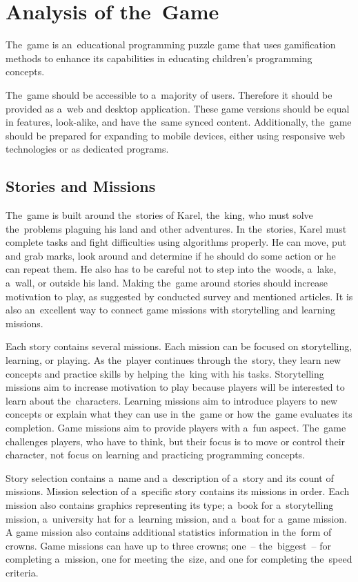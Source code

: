 \section{Analysis of the~Game}
\label{analysis:game}

The~game \emph{\myAppName} is an~educational programming puzzle game that uses gamification methods to enhance its capabilities in educating children's programming concepts.

The~game should be accessible to a~majority of users.
Therefore it should be provided as a~web and desktop application.
These game versions should be equal in features, look-alike, and have the~same synced content.
Additionally, the~game should be prepared for expanding to mobile devices, either using responsive web technologies or as dedicated programs.

\subsection{Stories and Missions}
\label{analysis:game:stories-and-missions}

The~game is built around the~stories of Karel, the~king, who must solve the~problems plaguing his land and other adventures.
In the~stories, Karel must complete tasks and fight difficulties using algorithms properly.
He can move, put and grab marks, look around and determine if he should do some action or he can repeat them.
He also has to be careful not to step into the~woods, a~lake, a~wall, or outside his land.
Making the~game around stories should increase motivation to play, as suggested by conducted survey and mentioned articles.
It is also an~excellent way to connect game missions with storytelling and learning missions.

Each story contains several missions.
Each mission can be focused on storytelling, learning, or playing.
As the~player continues through the~story, they learn new concepts and practice skills by helping the~king with his tasks.
Storytelling missions aim to increase motivation to play because players will be interested to learn about the~characters.
Learning missions aim to introduce players to new concepts or explain what they can use in the~game or how the~game evaluates its completion.
Game missions aim to provide players with a~fun aspect.
The~game challenges players, who have to think, but their focus is to move or control their character, not focus on learning and practicing programming concepts.

Story selection contains a~name and a~description of a~story and its count of missions.
Mission selection of a~specific story contains its missions in order.
Each mission also contains graphics representing its type; a~book for a~storytelling mission, a~university hat for a~learning mission, and a~boat for a~game mission.
A game mission also contains additional statistics information in the~form of crowns.
Game missions can have up to three crowns; one~-- the~biggest~-- for completing a~mission, one for meeting the~size, and one for completing the~speed criteria.

